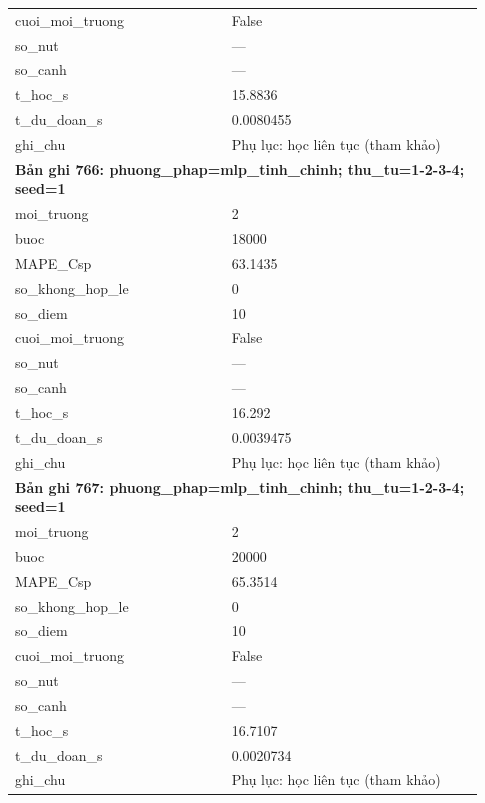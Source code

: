 \begin{longtable}{p{0.43\linewidth}p{0.50\linewidth}}
cuoi\_\allowbreak moi\_\allowbreak truong & False \\
so\_\allowbreak nut & — \\
so\_\allowbreak canh & — \\
t\_\allowbreak hoc\_\allowbreak s & 15.8836 \\
t\_\allowbreak du\_\allowbreak doan\_\allowbreak s & 0.0080455 \\
ghi\_\allowbreak chu & Phụ lục: học liên tục (tham khảo) \\
\midrule
\multicolumn{2}{p{0.95\linewidth}}{\textbf{Bản ghi 766: phuong\_phap=mlp\_tinh\_chinh; thu\_tu=1-2-3-4; seed=1}} \\
moi\_\allowbreak truong & 2 \\
buoc & 18000 \\
MAPE\_\allowbreak Csp & 63.1435 \\
so\_\allowbreak khong\_\allowbreak hop\_\allowbreak le & 0 \\
so\_\allowbreak diem & 10 \\
cuoi\_\allowbreak moi\_\allowbreak truong & False \\
so\_\allowbreak nut & — \\
so\_\allowbreak canh & — \\
t\_\allowbreak hoc\_\allowbreak s & 16.292 \\
t\_\allowbreak du\_\allowbreak doan\_\allowbreak s & 0.0039475 \\
ghi\_\allowbreak chu & Phụ lục: học liên tục (tham khảo) \\
\midrule
\multicolumn{2}{p{0.95\linewidth}}{\textbf{Bản ghi 767: phuong\_phap=mlp\_tinh\_chinh; thu\_tu=1-2-3-4; seed=1}} \\
moi\_\allowbreak truong & 2 \\
buoc & 20000 \\
MAPE\_\allowbreak Csp & 65.3514 \\
so\_\allowbreak khong\_\allowbreak hop\_\allowbreak le & 0 \\
so\_\allowbreak diem & 10 \\
cuoi\_\allowbreak moi\_\allowbreak truong & False \\
so\_\allowbreak nut & — \\
so\_\allowbreak canh & — \\
t\_\allowbreak hoc\_\allowbreak s & 16.7107 \\
t\_\allowbreak du\_\allowbreak doan\_\allowbreak s & 0.0020734 \\
ghi\_\allowbreak chu & Phụ lục: học liên tục (tham khảo) \\

\end{longtable}
